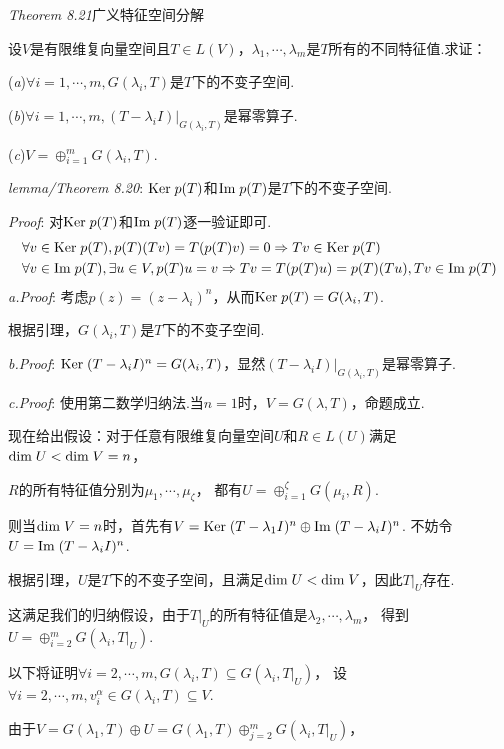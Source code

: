 \textit{Theorem 8.21}{\kaishu 广义特征空间分解}

设\(V\)是有限维复向量空间且\(T \in L(V)\)，\(\lambda_1,\cdots,\lambda_m\)是\(T\)所有的不同特征值.求证：

(\textit{a})\(\forall i=1,\cdots,m,G(\lambda_i,T)\)是\(T\)下的不变子空间.

(\textit{b})\(\forall i=1,\cdots,m,(T-\lambda_i I)|_{G(\lambda_i,T)}\)是幂零算子.

(\textit{c})\(V=\oplus_{i=1}^m G(\lambda_i,T)\).

\textit{lemma/Theorem 8.20}:
\(\mathrm{Ker \;} p(T)\)和\(\mathrm{Im \;} p(T)\)是\(T\)下的不变子空间.

\textit{Proof}:
    对\(\mathrm{Ker \;} p(T)\)和\(\mathrm{Im \;} p(T)\)逐一验证即可.
    \begin{align*}
        &\forall v \in \mathrm{Ker \;} p(T),p(T)(Tv)=T(p(T)v)=0 \Rightarrow Tv \in \mathrm{Ker \;} p(T) \\
        &\forall v \in \mathrm{Im \;} p(T),\exists u \in V,p(T)u=v \Rightarrow Tv=T(p(T)u)=p(T)(Tu),Tv \in \mathrm{Im \;} p(T)
    \end{align*}
\textit{a.Proof}:
考虑\(p(z)=(z-\lambda_i)^n\)，从而\(\mathrm{Ker \;} p(T)=G(\lambda_i,T)\).

根据引理，\(G(\lambda_i,T)\)是\(T\)下的不变子空间.

\textit{b.Proof}:
\(\mathrm{Ker \;} (T-\lambda_i I)^n=G(\lambda_i,T)\)，显然\((T-\lambda_i I)|_{G(\lambda_i,T)}\)是幂零算子.

\textit{c.Proof}:
使用第二数学归纳法.当\(n=1\)时，\(V=G(\lambda,T)\)，命题成立.

现在给出假设：对于任意有限维复向量空间\(U\)和\(R \in L(U)\)满足\(\mathrm{dim \;} U<\mathrm{dim \;} V=n\)，

\(R\)的所有特征值分别为\(\mu_1,\cdots,\mu_\zeta\)，
都有\(U=\oplus_{i=1}^\zeta G(\mu_i,R)\).

则当\(\mathrm{dim \;} V=n\)时，首先有\(V=\mathrm{Ker \;} (T-\lambda_1 I)^n \oplus \mathrm{Im \;} (T-\lambda_i I)^n\).
不妨令\(U=\mathrm{Im \;} (T-\lambda_i I)^n\).

根据引理，\(U\)是\(T\)下的不变子空间，且满足\(\mathrm{dim \;} U<\mathrm{dim \;} V\)，因此\(T|_U\)存在.

这满足我们的归纳假设，由于\(T|_U\)的所有特征值是\(\lambda_2,\cdots,\lambda_m\)，
得到\(U=\oplus_{i=2}^m G(\lambda_i,T|_U)\).

以下将证明\(\forall i=2,\cdots,m,G(\lambda_i,T) \subseteq G(\lambda_i,T|_U)\)，
设\(\forall i=2,\cdots,m,v_i^\alpha \in G(\lambda_i,T) \subseteq V\).

由于\(V=G(\lambda_1,T) \oplus U=G(\lambda_1,T) \oplus_{j=2}^m G(\lambda_i,T|_U)\)，

